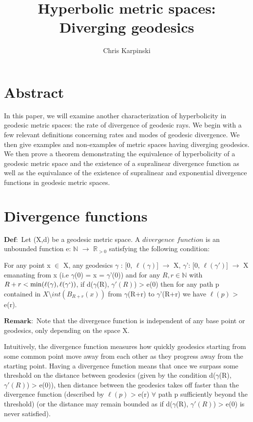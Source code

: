 \documentclass[11pt]{article}
\newcommand{\vs}{\vskip10pt}
\begin{document}
	
	\title{Hyperbolic metric spaces: Diverging geodesics}
	\author{Chris Karpinski}
	\maketitle
	
	\section{Abstract}
	
	In this paper, we will examine another characterization of hyperbolicity in geodesic metric spaces: the rate of divergence of geodesic rays. We begin with a few relevant definitions concerning rates and modes of geodesic divergence. We then give examples and non-examples of metric spaces having diverging geodesics. We then prove a theorem demonstrating the equivalence of hyperbolicity of a geodesic metric space and the existence of a supralinear divergence function as well as the equivalance of the existence of supralinear and exponential divergence functions in geodesic metric spaces. 
	
	\section{Divergence functions}
	
	$\mathbf{Def:}$ Let (X,d) be a geodesic metric space. A $\mathit{divergence}$ $\mathit{ function}$ is an unbounded function e: $\mathbb{N}$ $\rightarrow$ $\mathbb{R}_{>0}$ satisfying the following condition:
	
	\vs
	
	For any point x $\in$ X, any geodesics $\gamma$ : [0, $\ell(\gamma)$] $\rightarrow$ X, $\gamma$': [0, $\ell(\gamma')$] $\rightarrow$ X emanating from x (i.e $\gamma$(0) = x = $\gamma$'(0)) and for any $R,r \in \mathbb{N}$ with $R+r < \min(\ell(\gamma), \ell(\gamma`))$, if d($\gamma$(R), $\gamma'(R)$) > e(0) then for any path p contained in $X \setminus int(B_{R+r}(x))$ from $\gamma$(R+r) to $\gamma$'(R+r) we have $\ell (p) $ > e(r).
	
	\vs
		$\mathbf{Remark:}$ Note that the divergence function is independent of any base point or geodesics, only depending on the space X. 
	
	\vs 
	
	Intuitively, the divergence function measures how quickly geodesics starting from some common point move away from each other as they progress away from the starting point. Having a divergence function means that once we surpass some threshold on the distance between geodesics (given by the condition d($\gamma$(R), $\gamma'(R)$) > e(0)), then distance between the geodesics takes off faster than the divergence function (described by $\ell (p)$ > e(r) $\forall $ path p sufficiently beyond the threshold) (or the distance may remain bounded as if d($\gamma$(R), $\gamma'(R)$) > e(0) is never satisfied).
	
\end{document}
